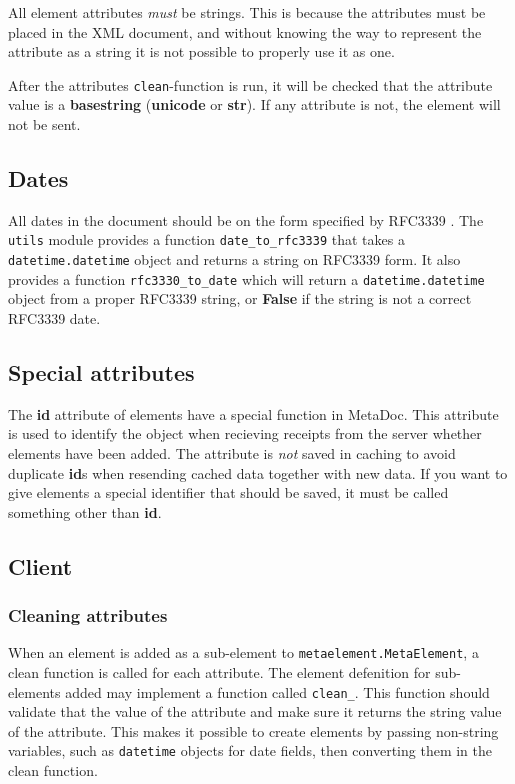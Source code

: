 \documentclass[titlepage, a4paper,10pt]{article}
\begin{document}
All element attributes \textit{must} be strings. This is because the attributes 
must be placed in the XML document, and without knowing the way to represent the 
attribute as a string it is not possible to properly use it as one.

After the attributes \texttt{clean}-function is run, it will be checked that
the attribute value is a \textbf{basestring} (\textbf{unicode} or
\textbf{str}). If any attribute is not, the element will not be sent. 

\subsection{Dates}

All dates in the document should be on the form specified by RFC3339 
\cite{rfc3339}. The \texttt{utils} module provides a function 
\texttt{date\_to\_rfc3339} that takes a \texttt{datetime.datetime} object and 
returns a string on RFC3339 form. It also provides a function
\texttt{rfc3330\_to\_date} which will return a \texttt{datetime.datetime}
object from a proper RFC3339 string, or \textbf{False} if the string is not a
correct RFC3339 date.

\subsection{Special attributes}

The \textbf{id} attribute of elements have a special function in MetaDoc. This 
attribute is used to identify the object when recieving receipts from the server 
whether elements have been added. The attribute is \textit{not} saved in caching 
to avoid duplicate \textbf{id}s when resending cached data together with new 
data. If you want to give elements a special identifier that should be saved, it 
must be called something other than \textbf{id}.

\subsection{Client}

\subsubsection{Cleaning attributes}

When an element is added as a sub-element to \texttt{metaelement.MetaElement}, a 
clean function is called for each attribute. The element defenition for 
sub-elements added may implement a function called 
\texttt{clean\_<attribute name>}. This function should validate that the value 
of the attribute and make sure it returns the string value of the attribute. 
This makes it possible to create elements by passing non-string variables, such 
as \texttt{datetime} objects for date fields, then converting them in the clean 
function. 
\end{document}
